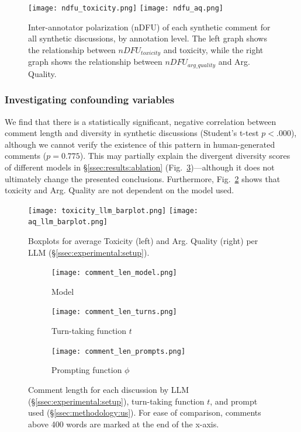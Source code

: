 \begin{figure}[t]
	\texttt{[image: ndfu\_toxicity.png]} \hfill
	\texttt{[image: ndfu\_aq.png]}
	\centering
	\caption{Inter-annotator polarization (nDFU) of each synthetic comment for all synthetic discussions, by annotation level. The left graph shows the relationship between $nDFU_{toxicity}$ and toxicity, while the right graph shows the relationship between $nDFU_{arg\_quality}$ and Arg. Quality.}
	\label{fig:ndfu_annot}
\end{figure}


\subsubsection{Investigating confounding variables}

We find that there is a statistically significant, negative correlation between comment length and diversity in synthetic discussions (Student's t-test  $p < .000$), although we cannot verify the existence of this pattern in human-generated comments ($p = 0.775$). This may partially explain the divergent diversity scores of different models in \S\ref{ssec:results:ablation}  (Fig.~\ref{fig:comment_length_model})---although it does not ultimately change the presented conclusions. Furthermore, Fig.~\ref{fig:toxicity_aq_model} shows that toxicity and Arg. Quality are not dependent on the model used.

\begin{figure}[ht]
	\texttt{[image: toxicity\_llm\_barplot.png]} \hfill
	\texttt{[image: aq\_llm\_barplot.png]}
	\centering
	\caption{Boxplots for average Toxicity (left) and Arg. Quality (right) per LLM (\S\ref{ssec:experimental:setup}).}
	\label{fig:toxicity_aq_model}
\end{figure}

\begin{figure}[t]
	\begin{subfigure}{0.32\linewidth}
		\texttt{[image: comment\_len\_model.png]}
		\caption{Model}
		\label{fig:comment_length_model}
	\end{subfigure}%
	\hfill
	\begin{subfigure}{0.32\linewidth}
		\texttt{[image: comment\_len\_turns.png]}
		\caption{Turn-taking function $t$}
		\label{fig:comment_length_turns}
	\end{subfigure}%
	\hfill
	\begin{subfigure}{0.32\linewidth}
		\texttt{[image: comment\_len\_prompts.png]}
		\caption{Prompting function $\phi$}
		\label{fig:comment_length_prompts}
	\end{subfigure}%
	
	\caption{Comment length for each discussion by LLM (\S\ref{ssec:experimental:setup}), turn-taking function $t$, and prompt used (\S\ref{ssec:methodology:us}). For ease of comparison, comments above 400 words are marked at the end of the x-axis.}
	\label{fig:comment_length}
\end{figure}


